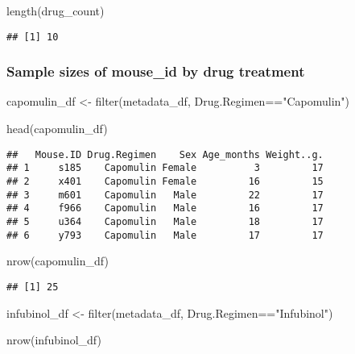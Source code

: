 \documentclass[
]{article}
\newenvironment{Shaded}{\begin{snugshade}}{\end{snugshade}}
\newcommand{\FunctionTok}[1]{\textcolor[rgb]{0.00,0.00,0.00}{#1}}
\newcommand{\NormalTok}[1]{#1}
\newcommand{\OtherTok}[1]{\textcolor[rgb]{0.56,0.35,0.01}{#1}}
\newcommand{\SpecialCharTok}[1]{\textcolor[rgb]{0.00,0.00,0.00}{#1}}
\newcommand{\StringTok}[1]{\textcolor[rgb]{0.31,0.60,0.02}{#1}}
\begin{document}
\begin{Shaded}
\begin{Highlighting}[]
\FunctionTok{length}\NormalTok{(drug\_count)}
\end{Highlighting}
\end{Shaded}

\begin{verbatim}
## [1] 10
\end{verbatim}

\hypertarget{sample-sizes-of-mouse_id-by-drug-treatment}{%
\subsubsection{Sample sizes of mouse\_id by drug
treatment}\label{sample-sizes-of-mouse_id-by-drug-treatment}}

\begin{Shaded}
\begin{Highlighting}[]
\NormalTok{capomulin\_df }\OtherTok{\textless{}{-}} \FunctionTok{filter}\NormalTok{(metadata\_df, Drug.Regimen}\SpecialCharTok{==}\StringTok{"Capomulin"}\NormalTok{)}

\FunctionTok{head}\NormalTok{(capomulin\_df)}
\end{Highlighting}
\end{Shaded}

\begin{verbatim}
##   Mouse.ID Drug.Regimen    Sex Age_months Weight..g.
## 1     s185    Capomulin Female          3         17
## 2     x401    Capomulin Female         16         15
## 3     m601    Capomulin   Male         22         17
## 4     f966    Capomulin   Male         16         17
## 5     u364    Capomulin   Male         18         17
## 6     y793    Capomulin   Male         17         17
\end{verbatim}

\begin{Shaded}
\begin{Highlighting}[]
\FunctionTok{nrow}\NormalTok{(capomulin\_df)}
\end{Highlighting}
\end{Shaded}

\begin{verbatim}
## [1] 25
\end{verbatim}

\begin{Shaded}
\begin{Highlighting}[]
\NormalTok{infubinol\_df }\OtherTok{\textless{}{-}} \FunctionTok{filter}\NormalTok{(metadata\_df, Drug.Regimen}\SpecialCharTok{==}\StringTok{"Infubinol"}\NormalTok{)}

\FunctionTok{nrow}\NormalTok{(infubinol\_df)}
\end{Highlighting}
\end{Shaded}
\end{document}
